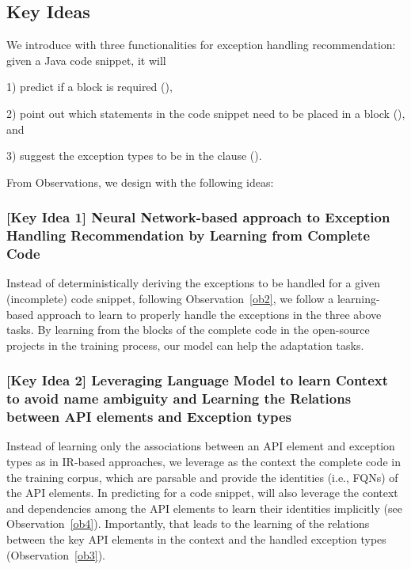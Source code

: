 \subsection{Key Ideas}
\label{key:sec}

We introduce {\tool} with three functionalities for exception handling
recommendation: given a Java code snippet, it will

1) predict if a  block is required ({\xblock}),

2) point out which statements in the code snippet need to be placed in
a  block ({\xstate}), and

3) suggest the exception types to be in the 
clause ({\xtype}).

From Observations, we design {\tool} with the following
ideas:

\subsubsection{{\bf [Key Idea 1] Neural Network-based approach to Exception Handling Recommendation by Learning from Complete Code}}
Instead of deterministically deriving the exceptions to be handled for
a given (incomplete) code snippet, following Observation~\ref{ob2}, we
follow a learning-based approach to learn to properly handle the
exceptions in the three above tasks.
By learning from the  blocks of the complete code in
the open-source projects in the training process, our model can
help the adaptation tasks.




\vspace{2pt}
\subsubsection{{\bf [Key Idea 2] Leveraging Language Model to learn Context to avoid
name ambiguity and Learning the Relations between API elements and
Exception types}} Instead of learning only the associations between an
API element and exception types as in IR-based approaches,
we leverage as the context the complete code in the training corpus,
which are parsable and provide the identities (i.e., FQNs) of the API
elements. In predicting for a code snippet, {\tool} will also leverage
the context and dependencies among the API elements to learn their
identities implicitly (see Observation~\ref{ob4}). Importantly, that
leads to the learning of the relations between the key API elements in
the context and the handled exception types (Observation~\ref{ob3}).

